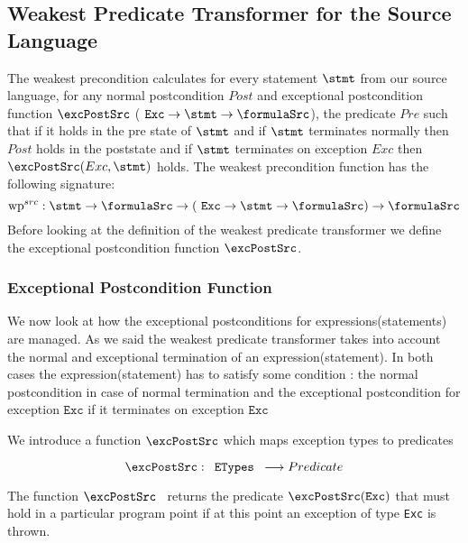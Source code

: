 
\subsection{Weakest Predicate Transformer for the Source Language } \label{pog:wpSrc}

The weakest precondition calculates for every statement $\stmt$ from our source language,
for any normal postcondition $Post$ and exceptional postcondition function $\excPostSrc$ ($ \mbox{ \rm \texttt{Exc}} \rightarrow \stmt \rightarrow \formulaSrc $),
 the predicate $Pre$ such that if it holds in the pre state of $\stmt$ and   if $\stmt$ terminates normally then $Post$ holds in the poststate and
 if $\stmt$ terminates on exception $Exc$ then $\excPostSrc(Exc, \stmt)$ holds.
The weakest precondition function has the following signature:
$$ \textrm{wp}^{src} : \stmt \rightarrow \formulaSrc \rightarrow ( \mbox{ \rm \texttt{Exc}} \rightarrow \stmt  \rightarrow \formulaSrc ) \rightarrow \formulaSrc$$
Before looking at the definition of the weakest predicate transformer we define the exceptional postcondition function $\excPostSrc$.


\subsubsection{Exceptional Postcondition Function}


We now look at how the exceptional postconditions for expressions(statements) are managed. 
As we said the weakest predicate transformer takes into account the normal and exceptional termination of 
an expression(statement). 
In both cases the expression(statement) has to satisfy some condition : 
the normal postcondition in case of normal termination and the exceptional postcondition
for exception $\texttt{Exc}$ if it terminates on exception $\texttt{Exc}$


We introduce a function $\excPostSrc$  which maps exception types to predicates  

$$ \excPostSrc :  \mbox{\rm \texttt{ ETypes  }}  \longrightarrow   Predicate $$ 


The function $\excPostSrc$ \ returns the predicate $\excPostSrc (\texttt{Exc}) $ that must hold in a particular program point if
 at this point an exception of type \texttt{Exc} is thrown.





